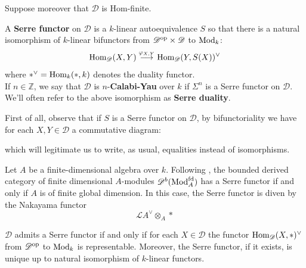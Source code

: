 Suppose moreover that $\mathscr{D}$ is Hom-finite. \\

\begin{defn}
A \textbf{Serre functor} on $\mathscr{D}$ is a $k$-linear autoequivalence $S$ so that there is a natural isomorphism of $k$-linear bifunctors from $\mathscr{D}^{\textnormal{op}} \times \mathscr{D}$ to $\textnormal{Mod}_k$: $$\textnormal{Hom}_{\mathscr{D}}(X,Y) \overset{\varphi_{X,Y}}{\longrightarrow} \textnormal{Hom}_{\mathscr{D}}(Y,S(X))^{\vee}$$
where $*^{\vee}=\textnormal{Hom}_k(*,k)$ denotes the duality functor. \\
If $n \in \mathbb{Z}$, we say that $\mathscr{D}$ is $n$-\textbf{Calabi-Yau} over $k$ if $\Sigma^n$ is a Serre functor on $\mathscr{D}$. We'll often refer to the above isomorphism as \textbf{Serre duality}.
\end{defn} 

First of all, observe that if $S$ is a Serre functor on $\mathscr{D}$, by bifunctoriality we have for each $X,Y \in \mathscr{D}$ a commutative diagram:
\begin{center}
\end{center}
which will legitimate us to write, as usual, equalities instead of isomorphisms. \\

\begin{exmp}
Let $A$ be a finite-dimensional algebra over $k$. Following \cite{kel}, the bounded derived category of finite dimensional $A$-modules $\mathscr{D}^b(\textnormal{Mod}_A^{\textnormal{fd}})$ has a Serre functor if and only if $A$ is of finite global dimension. In this case, the Serre functor is diven by the Nakayama functor $$\mathscr{L} A^{\vee} \otimes_A *$$ 
\end{exmp}

\begin{prop}
$\mathscr{D}$ admits a Serre functor if and only if for each $X \in \mathscr{D}$ the functor $\textnormal{Hom}_{\mathscr{D}}(X,*)^{\vee}$ from $\mathscr{D}^{\textnormal{op}}$ to $\textnormal{Mod}_k$ is representable. Moreover, the Serre functor, if it exists, is unique up to natural isomorphism of $k$-linear functors.
\end{prop}

